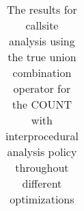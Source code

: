 \begin{table}[!htbp]
{\begin{tabular}{|c|c}
    	\end{tabular}
}


		\caption {The results for callsite analysis using the true union combination operator for the COUNT with interprocedural analysis policy throughout different optimizations}
		\label{tbl:CStrueunionCOUNTinter}
\end{table}
%
%	
